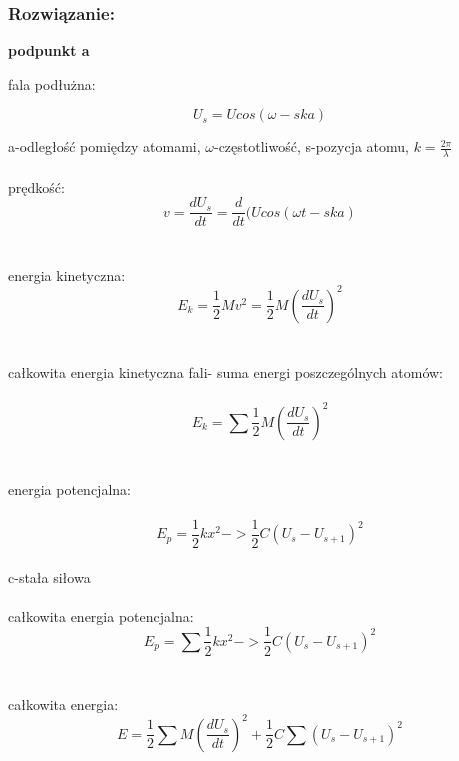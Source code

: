 \subsubsection*{Rozwiązanie:}
\textbf{podpunkt a}

fala podłużna: 

\begin{equation}
U_s=U cos(\omega-ska)
\end{equation}

a-odległość pomiędzy atomami,
$\omega$-częstotliwość,
s-pozycja atomu,
$k=\frac{2\pi}{\lambda}$
\\
\\
prędkość:
\\
\begin{equation}
v=\frac{dU_s}{dt}=\frac{d}{dt}(Ucos(\omega t- ska)
\end{equation}
\\
\\
energia kinetyczna:
\\
\begin{equation}
E_k=\frac{1}{2}Mv^2=\frac{1}{2}M(\frac{dU_s}{dt})^2
\end{equation}
\\
\\
całkowita energia kinetyczna fali- suma energi poszczególnych atomów:
\\
\\
\begin {equation}
E_k=\sum\frac{1}{2}M(\frac{dU_s}{dt})^2
\end{equation}
\\
\\
energia potencjalna:
\\
\\
\begin{equation}
E_p=\frac{1}{2}kx^2-> \frac{1}{2}C(U_s-U_{s+1})^2
\end{equation}
\\
c-stała siłowa
\\
\\
całkowita energia potencjalna:
\\
\begin{equation}
E_p=\sum\frac{1}{2}kx^2-> \frac{1}{2}C(U_s-U_{s+1})^2
\end{equation}
\\
\\
całkowita energia:
\\
\begin{equation}
E=\frac{1}{2}\sum M(\frac{dU_s}{dt})^2+\frac{1}{2}C\sum(U_s-U_{s+1})^2
\end{equation}
